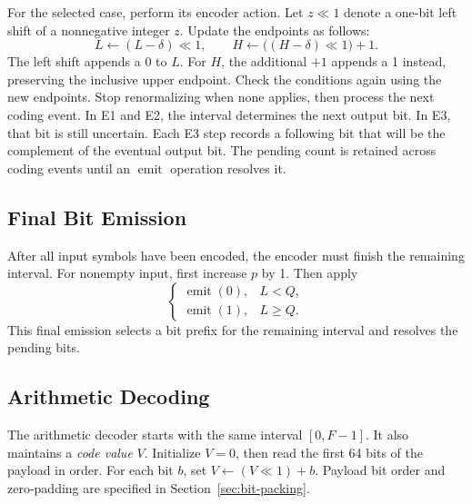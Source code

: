 \documentclass[12pt,onecolumn]{article}
\begin{document}
For the selected case, perform its encoder action.
Let $z\ll1$ denote a one-bit left shift of a nonnegative integer $z$.
Update the endpoints as follows:
\begin{equation}
  L\leftarrow (L-\delta)\ll1,\qquad
  H\leftarrow \bigl((H-\delta)\ll1\bigr)+1.
  \label{eq:renormalize}
\end{equation}
The left shift appends a 0 to $L$. For $H$, the additional $+1$ appends a 1
instead, preserving the inclusive upper endpoint.
Check the conditions again using the new endpoints.
Stop renormalizing when none applies, then process the next coding event.
In E1 and E2, the interval determines the next output bit.
In E3, that bit is still uncertain. Each E3 step records a following bit
that will be the complement of the eventual output bit.
The pending count is retained across coding events until an
$\operatorname{emit}$ operation resolves it.

\subsection{Final Bit Emission}
\label{sec:ac-finalization}

After all input symbols have been encoded, the encoder must finish the
remaining interval. For nonempty input, first increase $p$ by 1.
Then apply
\begin{equation}
  \begin{cases}
    \operatorname{emit}(0),&L<Q,\\
    \operatorname{emit}(1),&L\geq Q.
  \end{cases}
  \label{eq:ac-finalize}
\end{equation}
This final emission selects a bit prefix for the remaining interval and
resolves the pending bits.

\subsection{Arithmetic Decoding}
\label{sec:ac-decoding}

The arithmetic decoder starts with the same interval $[0,F-1]$.
It also maintains a \emph{code value} $V$. Initialize $V=0$, then read the
first 64 bits of the payload in order. For each bit $b$, set
$V\leftarrow (V\ll1)+b$. Payload bit order and zero-padding are specified
in Section~\ref{sec:bit-packing}.
\end{document}
